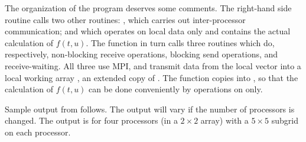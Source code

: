 The organization of the  program deserves some comments. The
right-hand side routine  calls two other routines: , which
carries out inter-processor communication; and  which operates on
local data only and contains the actual calculation of $f(t,u)$. The 
 function in turn calls three routines which do, respectively,
non-blocking receive operations, blocking send operations, and
receive-waiting. All three use MPI, and transmit data from the local 
vector into a local working array , an extended copy of .
The  function copies  into , so that the
calculation of $f(t,u)$ can be done conveniently by operations on 
 only.

Sample output from  follows. The output will vary if the
number of processors is changed. The output is for four processors 
(in a $2 \times 2$ array) with a $5 \times 5$ subgrid on each processor.

{\small}

